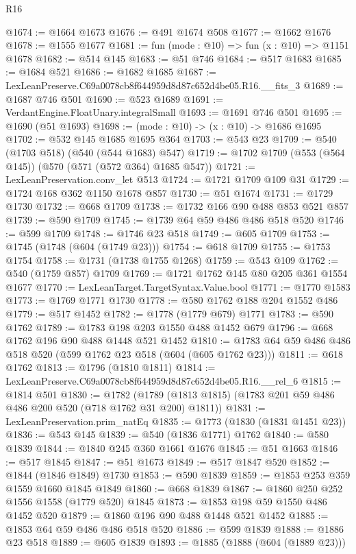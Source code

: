 \begin{lexlean}{R16}
\begin{coremodule}
@1674 := @1664 @1673
@1676 := @491 @1674 @508
@1677 := @1662 @1676
@1678 := @1555 @1677
@1681 := fun (mode : @10) => fun (x : @10) => @1151 @1678
@1682 := @514 @145
@1683 := @51 @746
@1684 := @517 @1683
@1685 := @1684 @521
@1686 := @1682 @1685
@1687 := LexLeanPreserve.C69a0078cb8f644959d8d87c652d4be05.R16.__fits_3
@1689 := @1687 @746 @501
@1690 := @523 @1689
@1691 := VerdantEngine.FloatUnary.integralSmall
@1693 := @1691 @746 @501
@1695 := @1690 (@51 @1693)
@1698 := (mode : @10) -> (x : @10) -> @1686 @1695
@1702 := @532 @145 @1685 @1695 @364
@1703 := @543 @23
@1709 := @540 (@1703 @518) (@540 (@544 @1683) @547)
@1719 := @1702 @1709 (@553 (@564 @145)) (@570 (@571 (@572 @364) @1685 @547))
@1721 := LexLeanPreservation.conv_let @513
@1724 := @1721 @1709 @109 @31
@1729 := @1724 @168 @362 @1150 @1678 @857
@1730 := @51 @1674
@1731 := @1729 @1730
@1732 := @668 @1709
@1738 := @1732 @166 @90 @488 @853 @521 @857
@1739 := @590 @1709
@1745 := @1739 @64 @59 @486 @486 @518 @520
@1746 := @599 @1709
@1748 := @1746 @23 @518
@1749 := @605 @1709
@1753 := @1745 (@1748 (@604 (@1749 @23)))
@1754 := @618 @1709
@1755 := @1753 @1754
@1758 := @1731 (@1738 @1755 @1268)
@1759 := @543 @109
@1762 := @540 (@1759 @857) @1709
@1769 := @1721 @1762 @145 @80 @205 @361 @1554 @1677
@1770 := LexLeanTarget.TargetSyntax.Value.bool
@1771 := @1770 @1583
@1773 := @1769 @1771 @1730
@1778 := @580 @1762 @188 @204 @1552 @486
@1779 := @517 @1452
@1782 := @1778 (@1779 @679) @1771
@1783 := @590 @1762
@1789 := @1783 @198 @203 @1550 @488 @1452 @679
@1796 := @668 @1762 @196 @90 @488 @1448 @521 @1452
@1810 := @1783 @64 @59 @486 @486 @518 @520 (@599 @1762 @23 @518 (@604 (@605 @1762 @23)))
@1811 := @618 @1762
@1813 := @1796 (@1810 @1811)
@1814 := LexLeanPreserve.C69a0078cb8f644959d8d87c652d4be05.R16.__rel_6
@1815 := @1814 @501
@1830 := @1782
    (@1789 (@1813 @1815) (@1783 @201 @59 @486 @486 @200 @520 (@718 @1762 @31 @200) @1811))
@1831 := LexLeanPreservation.prim_natEq
@1835 := @1773 (@1830 (@1831 @1451 @23))
@1836 := @543 @145
@1839 := @540 (@1836 @1771) @1762
@1840 := @580 @1839
@1844 := @1840 @245 @360 @1661 @1676
@1845 := @51 @1663
@1846 := @517 @1845
@1847 := @51 @1673
@1849 := @517 @1847 @520
@1852 := @1844 (@1846 @1849) @1730
@1853 := @590 @1839
@1859 := @1853 @253 @359 @1559 @1660 @1845 @1849
@1860 := @668 @1839
@1867 := @1860 @250 @252 @1556 @1558 (@1779 @520) @1845
@1873 := @1853 @198 @59 @1550 @486 @1452 @520
@1879 := @1860 @196 @90 @488 @1448 @521 @1452
@1885 := @1853 @64 @59 @486 @486 @518 @520
@1886 := @599 @1839
@1888 := @1886 @23 @518
@1889 := @605 @1839
@1893 := @1885 (@1888 (@604 (@1889 @23)))

\end{coremodule}
\end{lexlean}
